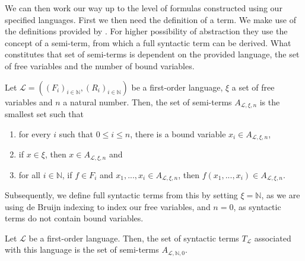We can then work our way up to the level of formulas constructed using our specified languages. First we then need the definition of a term. We make use of the definitions provided by \cite{ffl}. For higher possibility of abstraction they use the concept of a semi-term, from which a full syntactic term can be derived. What constitutes that set of semi-terms is dependent on the provided language, the set of free variables and the number of bound variables.

\begin{definition}\label{def:semi-term}
    \leanok
    Let $\mathcal{L} = ((F_i)_{i \in \mathbb{N}},(R_i)_{i \in \mathbb{N}})$ be a first-order language, $\xi$ a set of free variables and $n$ a natural number. Then, the set of semi-terms $A_{\mathcal{L},\xi,n}$ is the smallest set such that
    \begin{enumerate}
        \item for every $i$ such that $0 \leq i \leq n$, there is a bound variable $x_i \in A_{\mathcal{L},\xi,n}$,
        \item if $x \in \xi$, then $x \in A_{\mathcal{L},\xi,n}$ and
        \item for all $i \in \mathbb{N}$, if $f \in F_i$ and $x_1,...,x_i \in A_{\mathcal{L},\xi,n}$, then $f(x_1,...,x_i) \in A_{\mathcal{L},\xi,n}$.
    \end{enumerate}
\end{definition}

Subsequently, we define full syntactic terms from this by setting $\xi = \mathbb{N}$, as we are using de Bruijn indexing to index our free variables, and $n = 0$, as syntactic terms do not contain bound variables.

\begin{definition}\label{def:syntacticterm}
    \leanok
    Let $\mathcal{L}$ be a first-order language. Then, the set of syntactic terms $T_{\mathcal{L}}$ associated with this language is the set of semi-terms $A_{\mathcal{L},\mathbb{N},0}$. 
\end{definition}


